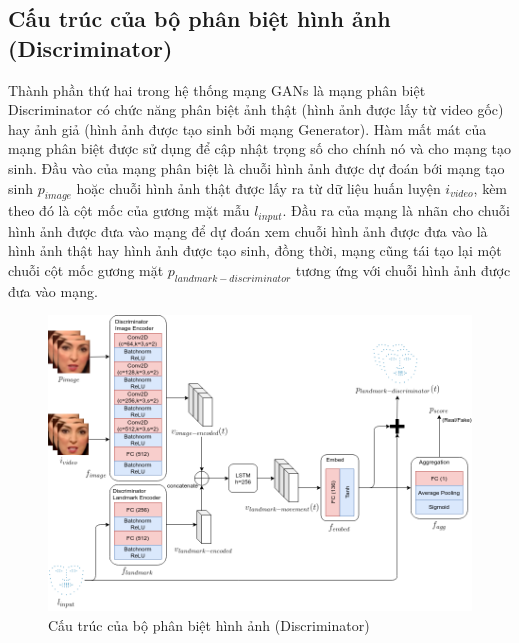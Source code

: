 \subsection{Cấu trúc của bộ phân biệt hình ảnh (Discriminator)}\label{sec:discriminator_detail}

Thành phần thứ hai trong hệ thống mạng GANs là mạng phân biệt Discriminator có chức năng phân biệt ảnh thật (hình ảnh được lấy từ video gốc) hay ảnh giả (hình ảnh được tạo sinh bởi mạng Generator). Hàm mất mát của mạng phân biệt được sử dụng để cập nhật trọng số cho chính nó và cho mạng tạo sinh. Đầu vào của mạng phân biệt là chuỗi hình ảnh được dự đoán bới mạng tạo sinh $p_{image}$ hoặc chuỗi hình ảnh thật được lấy ra từ dữ liệu huấn luyện $i_{video}$, kèm theo đó là cột mốc của gương mặt mẫu $l_{input}$. Đầu ra của mạng là nhãn cho chuỗi hình ảnh được đưa vào mạng để dự đoán xem chuỗi hình ảnh được đưa vào là hình ảnh thật hay hình ảnh được tạo sinh, đồng thời, mạng cũng tái tạo lại một chuỗi cột mốc gương mặt $p_{landmark-discriminator}$ tương ứng với chuỗi hình ảnh được đưa vào mạng.

\begin{figure}[H]
    \centering
    \includegraphics[width=15cm]{./content/materials/discriminator.png}
    \caption{Cấu trúc của bộ phân biệt hình ảnh (Discriminator)}
\end{figure}

